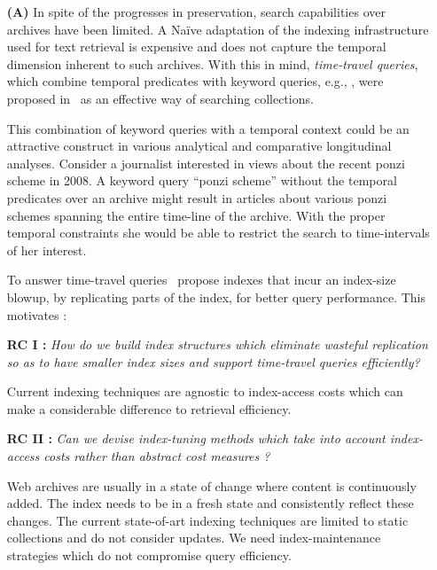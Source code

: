 \begin{enumerate}

\item[\textbf{(A)}] In spite of the progresses in preservation, search capabilities over archives have been limited. A Na\"ive adaptation of the indexing infrastructure used for text retrieval is expensive and does not capture the temporal dimension inherent to such archives. With this in mind, \emph{time-travel queries}, which combine temporal predicates with keyword queries, e.g., , were proposed in~\cite{kberberi:sigir2007} as an effective way of searching collections. 

This combination of keyword queries with a temporal context could be an attractive construct in various analytical and comparative longitudinal analyses. %
Consider a journalist interested in views about the recent ponzi scheme in 2008. A keyword query ``\textsf{ponzi scheme}'' without the temporal predicates 
over an archive might result in articles about various ponzi schemes spanning the entire time-line 
of the archive. With the proper temporal constraints she would be able to restrict the search to time-intervals of her interest.

To answer time-travel queries~\cite{kberberi:sigir2007} propose indexes that incur an index-size blowup, by replicating parts of the index, for better query performance. This motivates :

\textbf{RC I :} \textit{How do we build index structures which eliminate wasteful replication so as to have smaller index sizes and support time-travel queries efficiently?}

Current indexing techniques are agnostic to index-access costs which can make a considerable difference to retrieval efficiency.  

\textbf{RC II :} \textit{Can we devise index-tuning methods which take into account index-access costs rather than abstract cost measures ?} 

Web archives are usually in a state of change where content is continuously added. The index needs to be in a fresh state and consistently reflect these changes. The current state-of-art indexing techniques are limited to static collections and do not consider updates. We need index-maintenance strategies which do not compromise query efficiency. 


\end{enumerate}
